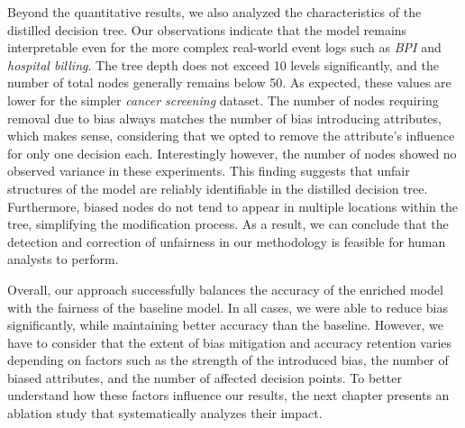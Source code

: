 Beyond the quantitative results, we also analyzed the characteristics of the distilled decision tree.
Our observations indicate that the model remains interpretable even for the more complex real-world event logs such as \textit{BPI} and \textit{hospital billing}.
The tree depth does not exceed 10 levels significantly, and the number of total nodes generally remains below 50.
As expected, these values are lower for the simpler \textit{cancer screening} dataset.
The number of nodes requiring removal due to bias always matches the number of bias introducing attributes,
which makes sense, considering that we opted to remove the attribute's influence for only one decision each.
Interestingly however, the number of nodes showed no observed variance in these experiments.
This finding suggests that unfair structures of the model are reliably identifiable in the distilled decision tree.
Furthermore, biased nodes do not tend to appear in multiple locations within the tree, simplifying the modification process.
As a result, we can conclude that the detection and correction of unfairness in our methodology is feasible for human analysts to perform.

Overall, our approach successfully balances the accuracy of the enriched model with the fairness of the baseline model.
In all cases, we were able to reduce bias significantly, while maintaining better accuracy than the baseline.
However, we have to consider that the extent of bias mitigation and accuracy retention
varies depending on factors such as the strength of the introduced bias,
the number of biased attributes, and the number of affected decision points.
To better understand how these factors influence our results,
the next chapter presents an ablation study that systematically analyzes their impact.